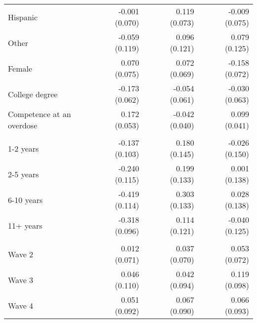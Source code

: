 \begin{table}[htbp]
\begin{adjustbox}{max width=\linewidth}
\begin{tabular}{l*{6}{D{.}{.}{-1}}}
Hispanic        &                  &-0.001 (0.070)         &                  &0.119 (0.073)         &                  &-0.009 (0.075)         \\
Other           &                  &-0.059 (0.119)         &                  &0.096 (0.121)         &                  &0.079 (0.125)         \\
Female          &                  &0.070 (0.075)         &                  &0.072 (0.069)         &                  &-0.158\sym{*} (0.072)         \\
College degree  &                  &-0.173\sym{**} (0.062)         &                  &-0.054 (0.061)         &                  &-0.030 (0.063)         \\
Competence at an overdose&                  &0.172\sym{**} (0.053)         &                  &-0.042 (0.040)         &                  &0.099\sym{*} (0.041)         \\
&                  &                  &                  &                  &                  &                  \\
1-2 years       &                  &-0.137 (0.103)         &                  &0.180 (0.145)         &                  &-0.026 (0.150)         \\
2-5 years       &                  &-0.240\sym{*} (0.115)         &                  &0.199 (0.133)         &                  &0.001 (0.138)         \\
6-10 years      &                  &-0.419\sym{***} (0.114)         &                  &0.303\sym{*} (0.133)         &                  &0.028 (0.138)         \\
11+ years       &                  &-0.318\sym{**} (0.096)         &                  &0.114 (0.121)         &                  &-0.040 (0.125)         \\
      &                  &                  &                  &                  &                  &                  \\
Wave 2          &                  &0.012 (0.071)         &                  &0.037 (0.070)         &                  &0.053 (0.072)         \\
Wave 3          &                  &0.046 (0.110)         &                  &0.042 (0.094)         &                  &0.119 (0.098)         \\
Wave 4          &                  &0.051 (0.092)         &                  &0.067 (0.090)         &                  &0.066 (0.093)         \\

\end{tabular}
\end{adjustbox}
\end{table}
